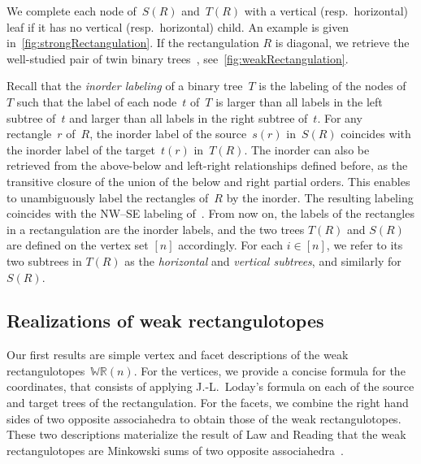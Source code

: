 \documentclass{amsart}
\theoremstyle{definition}
\newcommand{\darkblue}{\color{darkblue}} %
\newcommand{\defn}[1]{\textsl{\darkblue #1}} %
\newcommand{\polytope}[1]{\mathds{#1}} %
\newcommand{\WRP}{\polytope{WR}} %
\begin{document}

We complete each node of~$S(R)$ and~$T(R)$ with a vertical (resp.~horizontal) leaf if it has no vertical (resp.~horizontal) child.
An example is given in~\cref{fig:strongRectangulation}.
If the rectangulation $R$ is diagonal, we retrieve the well-studied pair of twin binary trees~\cite{MR1417289,MR2914637}, see~\cref{fig:weakRectangulation}.

Recall that the \defn{inorder labeling} of a binary tree~$T$ is the labeling of the nodes of~$T$ such that the label of each node~$t$ of~$T$ is larger than all labels in the left subtree of~$t$ and larger than all labels in the right subtree of~$t$.
For any rectangle~$r$ of~$R$, the inorder label of the source~$s(r)$ in~$S(R)$ coincides with the inorder label of the target~$t(r)$ in~$T(R)$.
The inorder can also be retrieved from the above-below and left-right relationships defined before, as the transitive closure of the union of the below and right partial orders.
This enables to unambiguously label the rectangles of~$R$ by the inorder.
The resulting labeling coincides with the NW--SE labeling of~\cite{ACFF24}.
From now on, the labels of the rectangles in a rectangulation are the inorder labels, and the two trees $T(R)$ and $S(R)$ are defined on the vertex set $[n]$ accordingly.
For each $i\in [n]$, we refer to its two subtrees in $T(R)$ as the \defn{horizontal} and \defn{vertical subtrees}, and similarly for $S(R)$.


\subsection{Realizations of weak rectangulotopes}
\label{subsec:weakRectangulotopes}

Our first results are simple vertex and facet descriptions of the weak rectangulotopes~$\WRP(n)$.
For the vertices, we provide a concise formula for the coordinates, that consists of applying J.-L.~Loday's formula on each of the source and target trees of the rectangulation.
For the facets, we combine the right hand sides of two opposite associahedra to obtain those of the weak rectangulotopes.
These two descriptions materialize the result of Law and Reading that the weak rectangulotopes are Minkowski sums of two opposite associahedra~\cite{MR2871762}.
\end{document}

